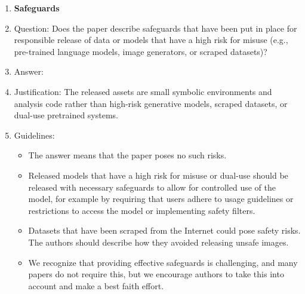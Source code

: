 \documentclass{article}
\begin{document}
\begin{enumerate}
\item {\bf Safeguards}
    \item[] Question: Does the paper describe safeguards that have been put in place for responsible release of data or models that have a high risk for misuse (e.g., pre-trained language models, image generators, or scraped datasets)?
    \item[] Answer: \answerNA{}
    \item[] Justification: The released assets are small symbolic environments and analysis code rather than high-risk generative models, scraped datasets, or dual-use pretrained systems.
    \item[] Guidelines:
    \begin{itemize}
        \item The answer \answerNA{} means that the paper poses no such risks.
        \item Released models that have a high risk for misuse or dual-use should be released with necessary safeguards to allow for controlled use of the model, for example by requiring that users adhere to usage guidelines or restrictions to access the model or implementing safety filters.
        \item Datasets that have been scraped from the Internet could pose safety risks. The authors should describe how they avoided releasing unsafe images.
        \item We recognize that providing effective safeguards is challenging, and many papers do not require this, but we encourage authors to take this into account and make a best faith effort.
    \end{itemize}


\end{enumerate}
\end{document}
